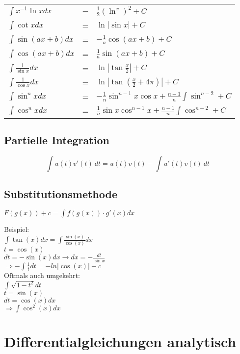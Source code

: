 \documentclass[german, 10pt, a4paper, twocolumn]{scrartcl}
\theoremstyle{definition}
\begin{document}
\begin{tabular}{lcl}
 $\int x^{-1}\ln x dx$ & = &			$\frac{1}{2}(\ln^x)^2 +C$\\
 $\int \cot x dx$ & = &				$\ln|\sin x| +C$\\
 $\int \sin (ax +b) dx$ & = &			$-\frac{1}{a}\cos(ax+b) +C$\\
 $\int \cos (ax +b) dx$ & = &			$\frac{1}{a}\sin(ax+b) +C$\\
 $\int \frac{1}{\sin x}dx$ & = &		$\ln|\tan\frac{x}{2}| +C$\\
 $\int \frac{1}{\cos x}dx$ & = &		$\ln|\tan(\frac{x}{2}+4\pi)| +C$\\
 $\int \sin^nxdx$ & = &				$-\frac{1}{n}\sin^{n-1}x\cos x+\frac{n-1}{n}\int\sin^{n-2} +C$\\
 $\int \cos^nxdx$ & = &				$\frac{1}{n}\sin x\cos^{n-1} x+\frac{n-1}{n}\int\cos^{n-2} +C$\\
\end{tabular}
\normalsize

\subsection{Partielle Integration}

$$\int u(t)v'(t)\:dt = u(t)v(t) - \int u'(t)v(t)\:dt$$

\subsection{Substitutionsmethode}

$F(g(x))+c=\int f(g(x))\cdotp g'(x) dx$

Beispiel:\\
$\int \tan(x) dx=\int \frac{\sin(x)}{\cos(x)}dx$\\
$t=\cos(x)$\\
$dt = -\sin (x)dx\rightarrow dx=-\frac{dt}{\sin x}$\\
$\Rightarrow-\int\frac{1}{t}dt=-ln|\cos (x)| + c$\\

Oftmals auch umgekehrt:\\
$\int \sqrt{1-t^2}dt$\\
$t=\sin (x)$\\
$dt=\cos (x)dx$\\
$\Rightarrow\int \cos^2(x)dx$

\section{Differentialgleichungen analytisch}
\end{document}
